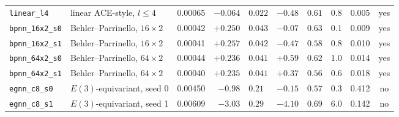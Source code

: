 \documentclass[aip,jcp,reprint,amsmath,amssymb,floatfix]{revtex4-2}
\begin{document}
\begin{table}[t]
\begin{ruledtabular}
\begin{tabular}{llcr@{\,$\pm$\,}lr@{\,$\pm$\,}lccc}
\texttt{linear\_l4}    & linear ACE-style, $l\le4$ & 0.00065 & $-0.064$ & $0.022$ & $-0.48$ & $0.61$ & 0.8 & 0.005 & yes \\
\texttt{bpnn\_16x2\_s0} & Behler--Parrinello, $16\times2$\footnotemark[2] & 0.00042 & $+0.250$ & $0.043$ & $-0.07$ & $0.63$ & 0.1 & 0.009 & yes \\
\texttt{bpnn\_16x2\_s1} & Behler--Parrinello, $16\times2$\footnotemark[2] & 0.00041 & $+0.257$ & $0.042$ & $-0.47$ & $0.58$ & 0.8 & 0.010 & yes \\
\texttt{bpnn\_64x2\_s0} & Behler--Parrinello, $64\times2$\footnotemark[2] & 0.00044 & $+0.236$ & $0.041$ & $+0.59$ & $0.62$ & 1.0 & 0.014 & yes \\
\texttt{bpnn\_64x2\_s1} & Behler--Parrinello, $64\times2$\footnotemark[2] & 0.00040 & $+0.235$ & $0.041$ & $+0.37$ & $0.56$ & 0.6 & 0.018 & yes \\
\texttt{egnn\_c8\_s0}  & $E(3)$-equivariant, seed 0 & 0.00450 & $-0.98$ & $0.21$ & $-0.15$ & $0.57$ & 0.3 & 0.412 & no \\
\texttt{egnn\_c8\_s1}  & $E(3)$-equivariant, seed 1 & 0.00609 & $-3.03$ & $0.29$ & $-4.10$ & $0.69$ & 6.0 & 0.142 & no \\
\end{tabular}
\end{ruledtabular}
\end{table}
\end{document}
